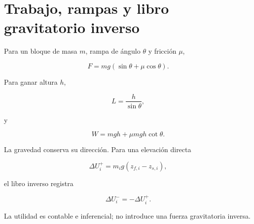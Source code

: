\section{Trabajo, rampas y libro gravitatorio inverso}

Para un bloque de masa \(m\), rampa de ángulo \(\theta\) y fricción \(\mu\),

\begin{equation}
F
=
mg(\sin\theta+\mu\cos\theta).
\end{equation}

Para ganar altura \(h\),

\begin{equation}
L=\frac{h}{\sin\theta},
\end{equation}

y

\begin{equation}
\boxed{
W
=
mgh
+
\mu mgh\cot\theta.
}
\end{equation}

La gravedad conserva su dirección. Para una elevación directa

\begin{equation}
\Delta U_i^+
=
m_i g(z_{f,i}-z_{s,i}),
\end{equation}

el libro inverso registra

\begin{equation}
\boxed{
\Delta U_i^-
=
-\Delta U_i^+.
}
\end{equation}

La utilidad es contable e inferencial; no introduce una fuerza gravitatoria inversa.
